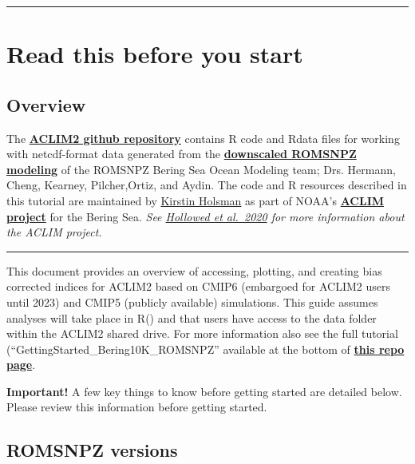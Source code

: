 \documentclass[
]{article}
\begin{document}
\begin{center}\rule{0.5\linewidth}{0.5pt}\end{center}

\hypertarget{read-this-before-you-start}{%
\section{Read this before you start}\label{read-this-before-you-start}}

\hypertarget{overview}{%
\subsection{Overview}\label{overview}}

The \href{https://github.com/kholsman/ACLIM2}{\textbf{ACLIM2 github
repository}} contains R code and Rdata files for working with
netcdf-format data generated from the
\href{https://beringnpz.github.io/roms-bering-sea}{\textbf{downscaled
ROMSNPZ modeling}} of the ROMSNPZ Bering Sea Ocean Modeling team; Drs.
Hermann, Cheng, Kearney, Pilcher,Ortiz, and Aydin. The code and R
resources described in this tutorial are maintained by
\href{mailto:kirstin.holsman@noaa.gov}{Kirstin Holsman} as part of
NOAA's
\href{https://www.fisheries.noaa.gov/alaska/ecosystems/alaska-climate-integrated-modeling-project}{\textbf{ACLIM
project}} for the Bering Sea. \emph{See
\href{https://www.frontiersin.org/articles/10.3389/fmars.2019.00775/full}{Hollowed
et al.~2020} for more information about the ACLIM project.}

\begin{center}\rule{0.5\linewidth}{0.5pt}\end{center}

This document provides an overview of accessing, plotting, and creating
bias corrected indices for ACLIM2 based on CMIP6 (embargoed for ACLIM2
users until 2023) and CMIP5 (publicly available) simulations. This guide
assumes analyses will take place in R() and that users have access to
the data folder within the ACLIM2 shared drive. For more information
also see the full tutorial (``GettingStarted\_Bering10K\_ROMSNPZ''
available at the bottom of
\href{https://github.com/kholsman/ACLIM2}{\textbf{this repo page}}.

\textbf{Important!} A few key things to know before getting started are
detailed below. Please review this information before getting started.

\hypertarget{romsnpz-versions}{%
\subsection{ROMSNPZ versions}\label{romsnpz-versions}}
\end{document}

